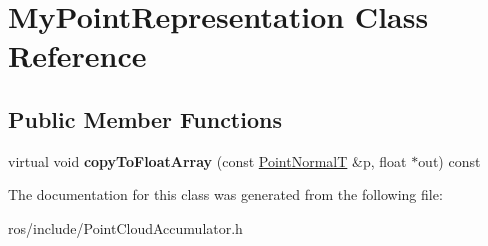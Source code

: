 \hypertarget{class_my_point_representation}{\section{\-My\-Point\-Representation \-Class \-Reference}
\label{class_my_point_representation}
}
\subsection*{\-Public \-Member \-Functions}
\begin{DoxyCompactItemize}
\item 
\hypertarget{class_my_point_representation_adaf372e3a1093398b90a3216494e8a1d}{virtual void {\bfseries copy\-To\-Float\-Array} (const \hyperlink{_helper_functions_8hpp_af8717e40603e7d4bcd56c56ec09aa10e}{\-Point\-Normal\-T} \&p, float $\ast$out) const }\label{class_my_point_representation_adaf372e3a1093398b90a3216494e8a1d}

\end{DoxyCompactItemize}


\-The documentation for this class was generated from the following file\-:\begin{DoxyCompactItemize}
\item 
ros/include/\-Point\-Cloud\-Accumulator.\-h\end{DoxyCompactItemize}
